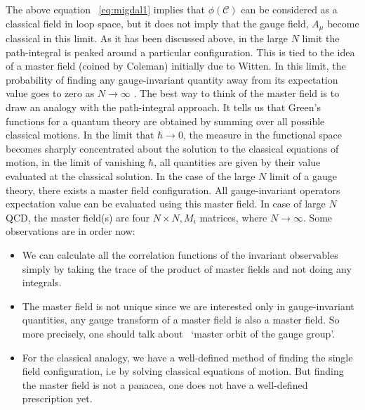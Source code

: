 The above equation ~\ref{eq:migdal1} implies that $ \phi(\mathcal{C})$ can be considered as a classical field in loop space, 
but it does not imply that the gauge field, $A_{\mu}$ become classical in this limit. 
As it has been discussed above, in the large $N$ limit the path-integral is peaked around a particular configuration. 
This is tied to the idea of a master field (coined by Coleman) initially due to Witten. In this limit, the probability of finding 
any gauge-invariant 
quantity away from its expectation value goes to zero as $N \to \infty$ \cite{Gopakumar:1994iq}.
The best way to think of the master field is to draw an analogy with the path-integral approach. 
It tells us that Green's functions for a quantum theory are obtained by summing over all possible classical motions. 
In the limit that $\hbar \to 0$, the measure in the functional space becomes sharply concentrated about the solution to
 the classical equations of motion, in the limit of vanishing $\hbar$, 
all quantities are given by their value evaluated at the classical solution. 
In the case of the large $N$ limit of a gauge theory, there exists a master field configuration. 
All gauge-invariant operators expectation value can be evaluated using this master field. 
In case of large $N$ QCD, the master field(s) are four $N \times N , M_{i}$ matrices, where $N \to \infty$.  
Some observations are in order now: 

\begin{itemize}
\item We can calculate all the correlation functions of the invariant observables simply by taking the trace of the product of master fields and not doing any integrals. 
\item The master field is not unique since we are interested only in gauge-invariant quantities, any gauge transform of a master field is also a master field. 
So more precisely, one should talk about ~`master orbit of the gauge group'. 
\item For the classical analogy, we have a well-defined method of finding the single field configuration, i.e by solving classical equations of motion. 
But finding the master field is not a panacea, one does not have a well-defined prescription yet.
\end{itemize} 





